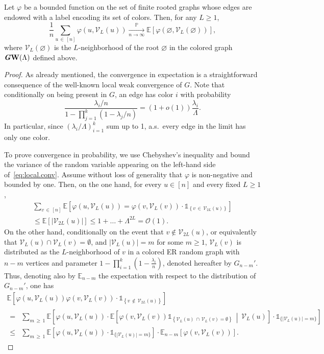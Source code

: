 \documentclass[AHL,Unicode,longabstracts,published]{cedram}
\def\mathbi#1{\textbf{\textit #1}}
\renewcommand{\Pr}{\mathbb{P}}
\newcommand{\bbE}{\mathbb{E}}
\newcommand{\cV}{\mathcal{V}}
\newcommand{\cO}{\mathcal{O}}
\begin{document}
\begin{prop}\label{prop:loc.conv}
Let $\varphi$ be a bounded function on the set of finite rooted graphs whose edges are endowed with a label encoding its set of colors. Then, for any $L\ge 1$,
\begin{equation}\label{eq:local.conv}
\frac 1n \sum_{u\,\in\,[n]} \varphi(u,\cV_L(u)) \xrightarrow[n\to \infty]{\Pr} \bbE[\varphi(\varnothing,\cV_L(\varnothing))],
\end{equation}
where $\cV_L(\varnothing)$ is the $L$-neighborhood of the root $\varnothing$ in the colored graph $\mathbi{GW}(\Lambda)$ defined above.
\end{prop}
\begin{proof}
As already mentioned, the convergence in expectation is a straightforward consequence of the well-known local weak convergence of $G$. Note that conditionally on being present in $G$, an edge has color $i$ with probability
\[
\frac{\lambda_i/n}{1-\prod_{j=1}^k\left(1-\lambda_j/n\right)}= (1+o(1))\frac{\lambda_i}{\Lambda}.
\]
In particular, since $(\lambda_i/\Lambda)_{i=1}^k$ sum up to 1, a.s.\ every edge in the limit has only one color.


To prove convergence in probability, we use Chebyshev's inequality and bound the variance of the random variable appearing on the left-hand side of~\eqref{eq:local.conv}. Assume without loss of generality that $\varphi$ is non-negative and bounded by one. Then, on the one hand, for every $u \in [n]$ and every fixed $L\ge 1$,
\begin{multline}\label{eq:cov.1}
\sum_{v\,\in\,[n]} \bbE\left[\varphi(u,\cV_L(u))= \varphi(v,\cV_L(v))\cdot
\mathds{1}_{\left\{v\,\in\,\cV_{2L}(u)\right\}}\right]\\
\le \bbE[|\cV_{2L}(u)|] 
\le 1+\dots+\Lambda^{2L}=\cO(1).
\end{multline}
On the other hand, conditionally on the event that $v\notin \cV_{2L}(u)$, or equivalently that $\cV_L(u)\cap \cV_L(v)=\emptyset$, and $|\cV_L(u)|=m$ for some $m\ge 1$, $\cV_L(v)$ is distributed as the $L$-neighborhood of $v$ in a colored ER random graph with $n-m$ vertices and parameter $1-\prod_{i=1}^k(1-\tfrac{\lambda_i}{n})$, denoted hereafter by $G_{n-m}'$. Thus, denoting also by $\bbE_{n-m}$ the expectation with respect to the distribution of $G_{n-m}'$, one has
\begin{multline*}
 \bbE\left[\varphi(u,\cV_L(u)) \varphi(v,\cV_L(v))\cdot
\mathds{1}_{\left\{ v\,\notin\,\cV_{2L}(u)\right\}}\right] \\
\begin{aligned}
= & \sum_{m\,\ge\,1} \bbE\left[\varphi(u,\cV_L(u)) \cdot \bbE\left[\varphi(v,\cV_L(v))\mathds 1_{\left\{\cV_L(u)\,\cap\,\cV_L(v)=\emptyset\right\}} \,\middle|\, \cV_L(u)\right]\cdot \mathds 1_{\{|\cV_L(u)|=m\}} \right] \\
\le & \sum_{m\,\ge\,1} \bbE\left[\varphi(u,\cV_L(u)) \cdot \mathds 1_{\{|\cV_L(u)|=m\}} \right]\cdot \bbE_{n-m}\left[\varphi(v,\cV_L(v))\right].
\end{aligned}
\end{multline*}


\end{proof}
\end{document}
